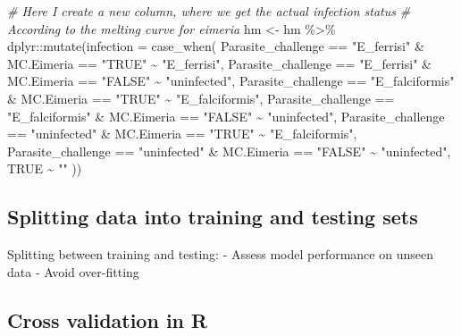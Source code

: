 \documentclass[
]{article}
\newenvironment{Shaded}{\begin{snugshade}}{\end{snugshade}}
\newcommand{\AttributeTok}[1]{\textcolor[rgb]{0.77,0.63,0.00}{#1}}
\newcommand{\CommentTok}[1]{\textcolor[rgb]{0.56,0.35,0.01}{\textit{#1}}}
\newcommand{\ConstantTok}[1]{\textcolor[rgb]{0.00,0.00,0.00}{#1}}
\newcommand{\FunctionTok}[1]{\textcolor[rgb]{0.00,0.00,0.00}{#1}}
\newcommand{\NormalTok}[1]{#1}
\newcommand{\OtherTok}[1]{\textcolor[rgb]{0.56,0.35,0.01}{#1}}
\newcommand{\SpecialCharTok}[1]{\textcolor[rgb]{0.00,0.00,0.00}{#1}}
\newcommand{\StringTok}[1]{\textcolor[rgb]{0.31,0.60,0.02}{#1}}
\begin{document}
\begin{Shaded}
\begin{Highlighting}[]
\CommentTok{\# Here I create a new column, where we get the actual infection status}
\CommentTok{\# According to the melting curve for eimeria }
\NormalTok{hm }\OtherTok{\textless{}{-}}\NormalTok{ hm }\SpecialCharTok{\%\textgreater{}\%}
\NormalTok{  dplyr}\SpecialCharTok{::}\FunctionTok{mutate}\NormalTok{(}\AttributeTok{infection =} \FunctionTok{case\_when}\NormalTok{(}
\NormalTok{    Parasite\_challenge }\SpecialCharTok{==} \StringTok{"E\_ferrisi"} \SpecialCharTok{\&}\NormalTok{ MC.Eimeria }\SpecialCharTok{==} \StringTok{"TRUE"} \SpecialCharTok{\textasciitilde{}} \StringTok{"E\_ferrisi"}\NormalTok{,}
\NormalTok{    Parasite\_challenge }\SpecialCharTok{==} \StringTok{"E\_ferrisi"} \SpecialCharTok{\&}\NormalTok{ MC.Eimeria }\SpecialCharTok{==} \StringTok{"FALSE"} \SpecialCharTok{\textasciitilde{}} \StringTok{"uninfected"}\NormalTok{,}
\NormalTok{    Parasite\_challenge }\SpecialCharTok{==} \StringTok{"E\_falciformis"} \SpecialCharTok{\&}\NormalTok{ MC.Eimeria }\SpecialCharTok{==} \StringTok{"TRUE"} \SpecialCharTok{\textasciitilde{}} \StringTok{"E\_falciformis"}\NormalTok{,}
\NormalTok{    Parasite\_challenge }\SpecialCharTok{==} \StringTok{"E\_falciformis"} \SpecialCharTok{\&}\NormalTok{ MC.Eimeria }\SpecialCharTok{==} \StringTok{"FALSE"} \SpecialCharTok{\textasciitilde{}} \StringTok{"uninfected"}\NormalTok{,}
\NormalTok{    Parasite\_challenge }\SpecialCharTok{==} \StringTok{"uninfected"} \SpecialCharTok{\&}\NormalTok{ MC.Eimeria }\SpecialCharTok{==} \StringTok{"TRUE"} \SpecialCharTok{\textasciitilde{}} \StringTok{"E\_falciformis"}\NormalTok{,}
\NormalTok{    Parasite\_challenge }\SpecialCharTok{==} \StringTok{"uninfected"} \SpecialCharTok{\&}\NormalTok{ MC.Eimeria }\SpecialCharTok{==} \StringTok{"FALSE"} \SpecialCharTok{\textasciitilde{}} \StringTok{"uninfected"}\NormalTok{,}
    \ConstantTok{TRUE} \SpecialCharTok{\textasciitilde{}} \StringTok{""}
\NormalTok{  ))}
\end{Highlighting}
\end{Shaded}

\hypertarget{splitting-data-into-training-and-testing-sets}{%
\subsection{Splitting data into training and testing
sets}\label{splitting-data-into-training-and-testing-sets}}

Splitting between training and testing: - Assess model performance on
unseen data - Avoid over-fitting

\hypertarget{cross-validation-in-r}{%
\subsection{Cross validation in R}\label{cross-validation-in-r}}
\end{document}
